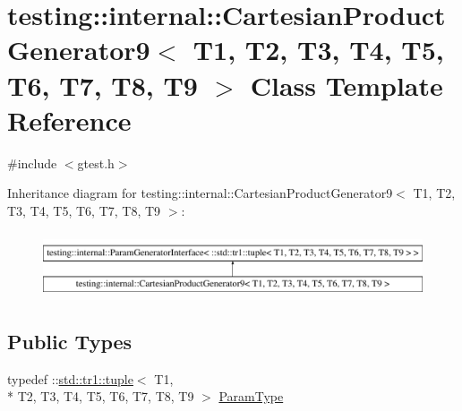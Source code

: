 \hypertarget{classtesting_1_1internal_1_1_cartesian_product_generator9}{\section{testing\-:\-:internal\-:\-:Cartesian\-Product\-Generator9$<$ T1, T2, T3, T4, T5, T6, T7, T8, T9 $>$ Class Template Reference}
\label{classtesting_1_1internal_1_1_cartesian_product_generator9}
}


{\ttfamily \#include $<$gtest.\-h$>$}

Inheritance diagram for testing\-:\-:internal\-:\-:Cartesian\-Product\-Generator9$<$ T1, T2, T3, T4, T5, T6, T7, T8, T9 $>$\-:\begin{figure}[H]
\begin{center}
\leavevmode
\includegraphics[height=1.947826cm]{classtesting_1_1internal_1_1_cartesian_product_generator9}
\end{center}
\end{figure}
\subsection*{Public Types}
\begin{DoxyCompactItemize}
\item 
typedef \-::\hyperlink{classstd_1_1tr1_1_1tuple}{std\-::tr1\-::tuple}$<$ T1, \\*
T2, T3, T4, T5, T6, T7, T8, T9 $>$ \hyperlink{classtesting_1_1internal_1_1_cartesian_product_generator9_a333de873be0c11965024ad94d5e958d9}{Param\-Type}
\end{DoxyCompactItemize}
